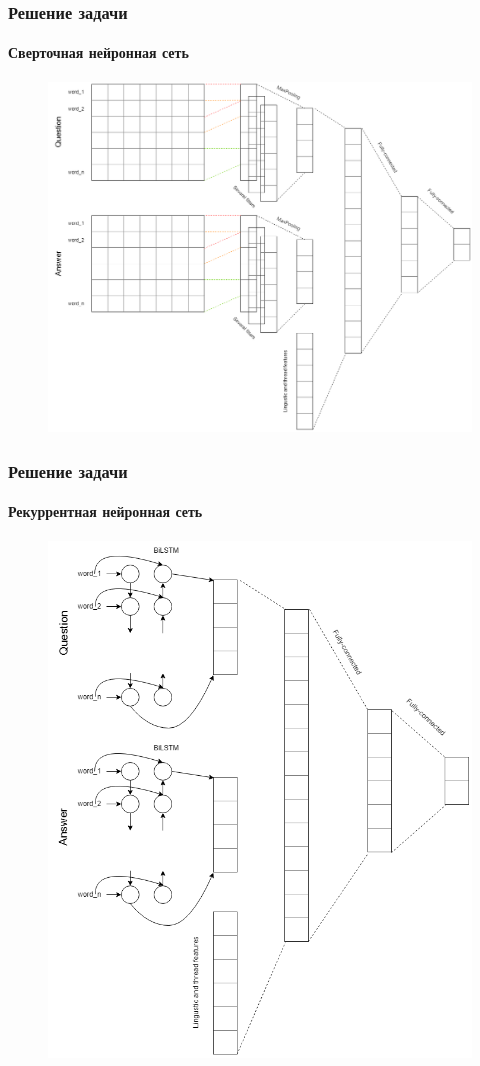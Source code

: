 \documentclass[10pt]{beamer}
\begin{document}

\begin{frame}
\frametitle{Решение задачи}
\framesubtitle{Сверточная нейронная сеть}

\begin{figure}
	\centering
	\includegraphics[width=0.7\linewidth]{images/my_cnn.png}
\end{figure}

\end{frame}


\begin{frame}
\frametitle{Решение задачи}
\framesubtitle{Рекуррентная нейронная сеть}

\begin{figure}
	\centering
	\includegraphics[width=0.5\linewidth]{images/my_rnn.png}
\end{figure}

\end{frame}
\end{document}
